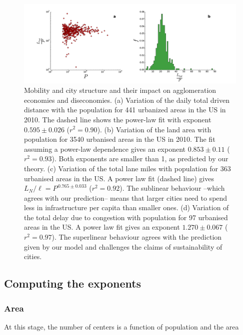 %
\begin{figure}
\includegraphics[width=1.0\textwidth]{gfx/chapter-scaling/figure_2.pdf}
\caption{Mobility and city structure and their impact on agglomeration economies and diseconomies. (a) Variation of the daily total driven distance with the population for 441 urbanized areas in the US in 2010. The dashed line shows the power-law fit with exponent $0.595 \pm 0.026$ ($r^2=0.90$). (b) Variation of the land area with population for 3540 urbanised areas in the US in 2010. The fit assuming a power-law dependence gives an exponent $0.853 \pm 0.11$ ($r^2=0.93$). Both exponents are smaller than 1, as predicted by our theory. (c) Variation of the total lane miles with population for 363 urbanised areas in the US. A power law fit  (dashed line) gives $L_N / \ell = P^{\,0.765 \pm 0.033}$ ($r^2=0.92$). The sublinear behaviour --which agrees with our prediction-- means that larger cities need to spend less in infrastructure per capita than smaller ones. (d) Variation of the total delay due to congestion with population for 97 urbanised areas in the US. A power law fit gives an exponent $1.270 \pm 0.067$ ($r^2=0.97$). The superlinear behaviour agrees with the prediction given by our model and challenges the claims of sustainability of cities.}
\end{figure}


\subsection{Computing the exponents}

\subsubsection{Area}

At this stage, the number of centers is a function of population and the area

